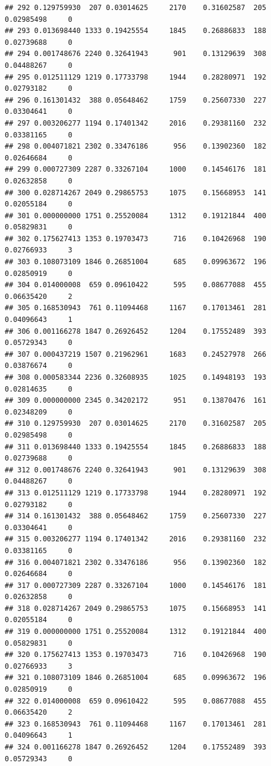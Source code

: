 \documentclass[
]{article}
\begin{document}
\begin{verbatim}
## 292 0.129759930  207 0.03014625     2170    0.31602587  205 0.02985498     0
## 293 0.013698440 1333 0.19425554     1845    0.26886833  188 0.02739688     0
## 294 0.001748676 2240 0.32641943      901    0.13129639  308 0.04488267     0
## 295 0.012511129 1219 0.17733798     1944    0.28280971  192 0.02793182     0
## 296 0.161301432  388 0.05648462     1759    0.25607330  227 0.03304641     0
## 297 0.003206277 1194 0.17401342     2016    0.29381160  232 0.03381165     0
## 298 0.004071821 2302 0.33476186      956    0.13902360  182 0.02646684     0
## 299 0.000727309 2287 0.33267104     1000    0.14546176  181 0.02632858     0
## 300 0.028714267 2049 0.29865753     1075    0.15668953  141 0.02055184     0
## 301 0.000000000 1751 0.25520084     1312    0.19121844  400 0.05829831     0
## 302 0.175627413 1353 0.19703473      716    0.10426968  190 0.02766933     3
## 303 0.108073109 1846 0.26851004      685    0.09963672  196 0.02850919     0
## 304 0.014000008  659 0.09610422      595    0.08677088  455 0.06635420     2
## 305 0.168530943  761 0.11094468     1167    0.17013461  281 0.04096643     1
## 306 0.001166278 1847 0.26926452     1204    0.17552489  393 0.05729343     0
## 307 0.000437219 1507 0.21962961     1683    0.24527978  266 0.03876674     0
## 308 0.000583344 2236 0.32608935     1025    0.14948193  193 0.02814635     0
## 309 0.000000000 2345 0.34202172      951    0.13870476  161 0.02348209     0
## 310 0.129759930  207 0.03014625     2170    0.31602587  205 0.02985498     0
## 311 0.013698440 1333 0.19425554     1845    0.26886833  188 0.02739688     0
## 312 0.001748676 2240 0.32641943      901    0.13129639  308 0.04488267     0
## 313 0.012511129 1219 0.17733798     1944    0.28280971  192 0.02793182     0
## 314 0.161301432  388 0.05648462     1759    0.25607330  227 0.03304641     0
## 315 0.003206277 1194 0.17401342     2016    0.29381160  232 0.03381165     0
## 316 0.004071821 2302 0.33476186      956    0.13902360  182 0.02646684     0
## 317 0.000727309 2287 0.33267104     1000    0.14546176  181 0.02632858     0
## 318 0.028714267 2049 0.29865753     1075    0.15668953  141 0.02055184     0
## 319 0.000000000 1751 0.25520084     1312    0.19121844  400 0.05829831     0
## 320 0.175627413 1353 0.19703473      716    0.10426968  190 0.02766933     3
## 321 0.108073109 1846 0.26851004      685    0.09963672  196 0.02850919     0
## 322 0.014000008  659 0.09610422      595    0.08677088  455 0.06635420     2
## 323 0.168530943  761 0.11094468     1167    0.17013461  281 0.04096643     1
## 324 0.001166278 1847 0.26926452     1204    0.17552489  393 0.05729343     0

\end{verbatim}
\end{document}
